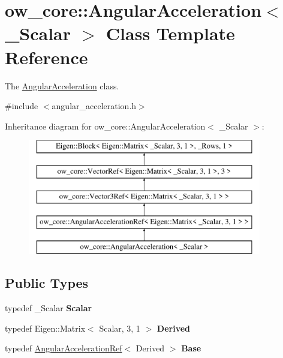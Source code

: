 \hypertarget{classow__core_1_1AngularAcceleration}{}\section{ow\+\_\+core\+:\+:Angular\+Acceleration$<$ \+\_\+\+Scalar $>$ Class Template Reference}
\label{classow__core_1_1AngularAcceleration}


The \hyperlink{classow__core_1_1AngularAcceleration}{Angular\+Acceleration} class.  




{\ttfamily \#include $<$angular\+\_\+acceleration.\+h$>$}

Inheritance diagram for ow\+\_\+core\+:\+:Angular\+Acceleration$<$ \+\_\+\+Scalar $>$\+:\begin{figure}[H]
\begin{center}
\leavevmode
\includegraphics[height=5.000000cm]{d2/d33/classow__core_1_1AngularAcceleration}
\end{center}
\end{figure}
\subsection*{Public Types}
\begin{DoxyCompactItemize}
\item 
typedef \+\_\+\+Scalar {\bfseries Scalar}\hypertarget{classow__core_1_1AngularAcceleration_ae8780d9abd70134aef459b9bf3b4a414}{}\label{classow__core_1_1AngularAcceleration_ae8780d9abd70134aef459b9bf3b4a414}

\item 
typedef Eigen\+::\+Matrix$<$ Scalar, 3, 1 $>$ {\bfseries Derived}\hypertarget{classow__core_1_1AngularAcceleration_a4ab24bb9f976fba36d1c35ca91ff4f95}{}\label{classow__core_1_1AngularAcceleration_a4ab24bb9f976fba36d1c35ca91ff4f95}

\item 
typedef \hyperlink{classow__core_1_1AngularAccelerationRef}{Angular\+Acceleration\+Ref}$<$ Derived $>$ {\bfseries Base}\hypertarget{classow__core_1_1AngularAcceleration_a7c46512723a6c5f857bc621e99d61cc5}{}\label{classow__core_1_1AngularAcceleration_a7c46512723a6c5f857bc621e99d61cc5}

\end{DoxyCompactItemize}

